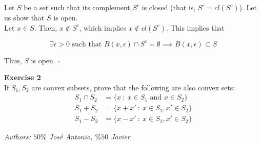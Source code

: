 \documentclass[11pt,table]{article}
\newcommand{\qed}{\hfill $\square$}
\newenvironment{problem}[2][Exercise]
{ \begin{mdframed}[backgroundcolor=gray!20] \textbf{#1 #2} \\}
	{\hspace{0.0cm}\newline\newline \emph{Authors: \(50\%\) José Antonio, \(\%50\) Javier}  \end{mdframed}}
\begin{document}
Let \(S\) be a set such that its complement $S^c$ is closed (that is, \(S^c = cl(S^c)\)). Let us show that \(S\) is open. \\

Let \(x \in S\). Then, \(x \notin S^c\), which implies \(x \notin cl(S^c)\). This implies that

\[
	\exists \epsilon > 0 \text{ such that } B(x,\epsilon) \cap S^c = \emptyset \implies B(x,\epsilon) \subset S
\]

Thus, $S$ is open. \qed \\

\begin{problem}{2}
If \( S_1, S_2 \) are convex subsets, prove that the following are also convex sets:
\begin{align*}
	S_{1} \cap S_{2} & = \{x \ : \ x \in S_{1} \text{ and } x \in S_{2}\} \\
	S_{1} + S_{2}    & = \{x + x' \ : \ x \in S_{1}, x' \in S_{2}\}       \\
	S_{1} - S_{2}    & = \{x - x' \ : \ x \in S_{1}, x' \in S_{2}\}
\end{align*}

\end{problem}
\end{document}
